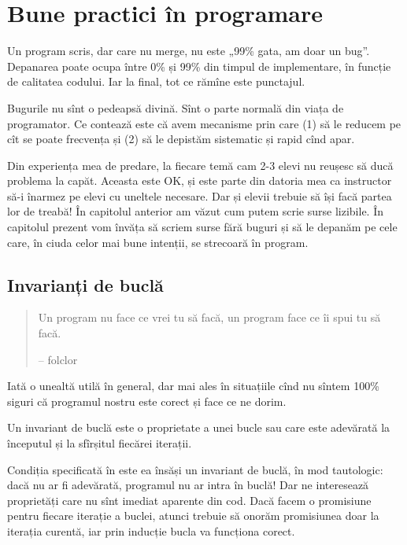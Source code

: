 \documentclass[../main.tex]{subfiles}
\begin{document}
\chapter{Bune practici în programare}

Un program scris, dar care nu merge, nu este „99\% gata, am doar un bug”. Depanarea poate ocupa între 0\% și 99\% din timpul de implementare, în funcție de calitatea codului. Iar la final, tot ce rămîne este punctajul.

Bugurile nu sînt o pedeapsă divină. Sînt o parte normală din viața de programator. Ce contează este că avem mecanisme prin care (1) să le reducem pe cît se poate frecvența și (2) să le depistăm sistematic și rapid cînd apar.

Din experiența mea de predare, la fiecare temă cam 2-3 elevi nu reușesc să ducă problema la capăt. Aceasta este OK, și este parte din datoria mea ca instructor să-i înarmez pe elevi cu uneltele necesare. Dar și elevii trebuie să își facă partea lor de treabă! În capitolul anterior am văzut cum putem scrie surse lizibile. În capitolul prezent vom învăța să scriem surse fără buguri și să le depanăm pe cele care, în ciuda celor mai bune intenții, se strecoară în program.


\section{Invarianți de buclă}

\begin{quote}
  Un program nu face ce vrei tu să facă, un program face ce îi spui tu să facă.

  \begin{flushright}
    -- folclor
  \end{flushright}
\end{quote}

Iată o unealtă utilă în general, dar mai ales în situațiile cînd nu sîntem 100\% siguri că programul nostru este corect și face ce ne dorim.

\begin{definition}
  Un invariant de buclă este o proprietate a unei bucle  sau  care este adevărată la începutul și la sfîrșitul fiecărei iterații.
\end{definition}

Condiția specificată în  este ea însăși un invariant de buclă, în mod tautologic: dacă nu ar fi adevărată, programul nu ar intra în buclă! Dar ne interesează proprietăți care nu sînt imediat aparente din cod. Dacă facem o promisiune pentru fiecare iterație a buclei, atunci trebuie să onorăm promisiunea doar la iterația curentă, iar prin inducție bucla va funcționa corect.
\end{document}
